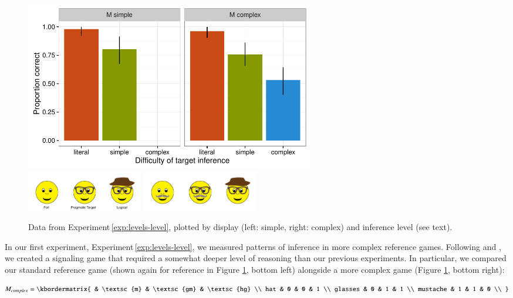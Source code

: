 \documentclass[man,noapacite]{apa2}
\newcounter{Experiment}
\newcommand{\exptref}[1]{Experiment\,\ref{#1}}
\begin{document}
 \begin{figure}[t]
  \centering
  \includegraphics[width=5in]{../plots/3-levels-levels.pdf}\\
  \hspace{6ex} \includegraphics[width=2in]{figures/hatglasses.pdf}\hspace{2ex}
  \includegraphics[width=2in]{figures/levels-levels-stim.pdf}
  \caption{\label{fig:levels-level} Data from \exptref{exp:levels-level}, plotted by display (left: simple, right: complex) and inference level (see text).}
\end{figure}

In our first experiment, \exptref{exp:levels-level}, we measured patterns of inference in more complex reference games. Following  and , we created a signaling game that required a somewhat deeper level of reasoning than our previous experiments. In particular, we compared our standard reference game (shown again for reference in Figure \ref{fig:levels-level}, bottom left) alongside a more complex game (Figure \ref{fig:levels-level}, bottom right):

\begin{equation}
    M_{complex} = \kbordermatrix{
      & \textsc{m} & \textsc{gm} & \textsc{hg} \\
      hat & 0 & 0 & 1  \\
      glasses & 0 & 1 & 1 \\
      mustache & 1 & 1 & 0 \\
    }
\end{equation}
\end{document}
